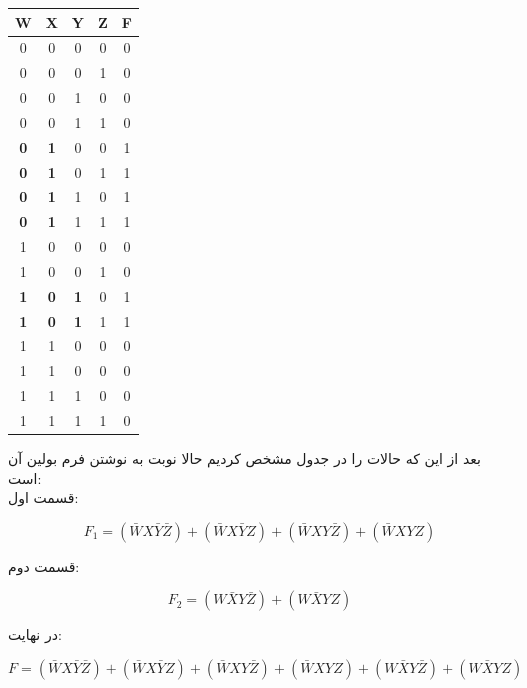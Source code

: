 \documentclass[20pt, a4paper]{article}
\begin{document}
\begin{LTR}
	\begin{tabular}{ c c c c | c }
		W & X & Y & Z & F \\
		\hline
		0 & 0 & 0 & 0 & 0 \\
		0 & 0 & 0 & 1 & 0 \\
		0 & 0 & 1 & 0 & 0 \\
		0 & 0 & 1 & 1 & 0 \\
	 	\textbf{0} & \textbf{1} & 0 & 0 & 1 \\
		\textbf{0} & \textbf{1} & 0 & 1 & 1 \\
		\textbf{0} & \textbf{1} & 1 & 0 & 1 \\
		\textbf{0} & \textbf{1} & 1 & 1 & 1 \\
		1 & 0 & 0 & 0 & 0 \\
		1 & 0 & 0 & 1 & 0 \\
		\textbf{1} & \textbf{0} & \textbf{1} & 0 & 1 \\
		\textbf{1} & \textbf{0} & \textbf{1} & 1 & 1 \\
		1 & 1 & 0 & 0 & 0 \\
		1 & 1 & 0 & 0 & 0 \\
		1 & 1 & 1 & 0 & 0 \\
		1 & 1 & 1 & 1 & 0 
	\end{tabular}
\end{LTR}
\hfill \break
بعد از این که حالات را در جدول مشخص کردیم حالا نوبت به نوشتن
فرم بولین آن است:\\

قسمت اول:
\begin{LTR}
	\begin{equation}
		F_{1} = (\bar{W}X\bar{Y}\bar{Z})+
		(\bar{W}X\bar{Y}Z)+
		(\bar{W}XY\bar{Z})+
		(\bar{W}XYZ) 
	\end{equation}
\end{LTR}

قسمت دوم:
\begin{LTR}
	\begin{equation}
		F_{2} = (W\bar{X}Y\bar{Z}) + (W\bar{X}YZ) 
	\end{equation}
\end{LTR}

در نهایت:
\begin{LTR}
	\begin{equation}
		F = (\bar{W}X\bar{Y}\bar{Z})+
		(\bar{W}X\bar{Y}Z)+
		(\bar{W}XY\bar{Z})+
		(\bar{W}XYZ) + 
		(W\bar{X}Y\bar{Z}) + 
		(W\bar{X}YZ)
	\end{equation}
\end{LTR}
\newpage
\end{document}
